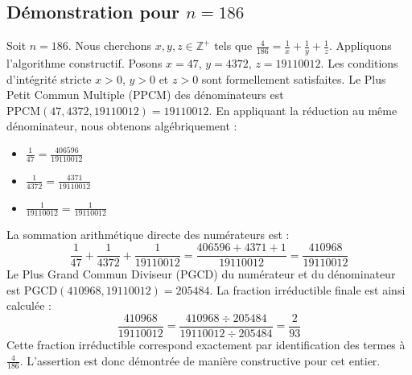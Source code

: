 \documentclass[11pt,a4paper]{article}
\begin{document}
\subsection{Démonstration pour $n = 186$}
Soit $n = 186$. Nous cherchons $x, y, z \in \mathbb{Z}^{+}$ tels que $\frac{4}{186} = \frac{1}{x} + \frac{1}{y} + \frac{1}{z}$.
Appliquons l'algorithme constructif. Posons $x = 47$, $y = 4372$, $z = 19110012$.
Les conditions d'intégrité stricte $x > 0$, $y > 0$ et $z > 0$ sont formellement satisfaites.
Le Plus Petit Commun Multiple (PPCM) des dénominateurs est $\text{PPCM}(47, 4372, 19110012) = 19110012$.
En appliquant la réduction au même dénominateur, nous obtenons algébriquement :
\begin{itemize}
    \item $\frac{1}{47} = \frac{406596}{19110012}$
    \item $\frac{1}{4372} = \frac{4371}{19110012}$
    \item $\frac{1}{19110012} = \frac{1}{19110012}$
\end{itemize}
La sommation arithmétique directe des numérateurs est :
$$ \frac{1}{47} + \frac{1}{4372} + \frac{1}{19110012} = \frac{406596 + 4371 + 1}{19110012} = \frac{410968}{19110012} $$
Le Plus Grand Commun Diviseur (PGCD) du numérateur et du dénominateur est $\text{PGCD}(410968, 19110012) = 205484$.
La fraction irréductible finale est ainsi calculée :
$$ \frac{410968}{19110012} = \frac{410968 \div 205484}{19110012 \div 205484} = \frac{2}{93} $$
Cette fraction irréductible correspond exactement par identification des termes à $\frac{4}{186}$. L'assertion est donc démontrée de manière constructive pour cet entier.
\end{document}
